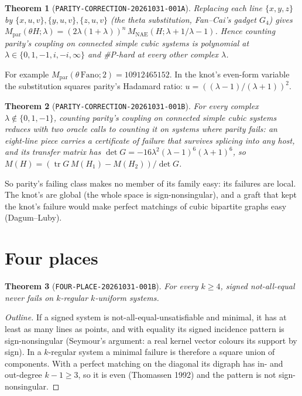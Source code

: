 \documentclass[11pt]{article}
\newtheorem{theorem}{Theorem}
\theoremstyle{definition}
\newcommand{\NAE}{\mathrm{NAE}}
\begin{document}
\begin{theorem}[\texttt{PARITY-CORRECTION-20261031-001A}]\label{thm:parity}
Replacing each line $\{x,y,z\}$ by $\{x,u,v\},\{y,u,v\},\{z,u,v\}$ (the theta substitution, Fan--Cai's gadget $G_4$) gives
$M_{\mathrm{par}}(\theta H;\lambda)=(2\lambda(1+\lambda))^n\,M_{\NAE}(H;\lambda+1/\lambda-1)$. Hence counting parity's coupling on
connected simple cubic systems is polynomial at $\lambda\in\{0,1,-1,i,-i,\infty\}$ and \#P-hard at every other complex $\lambda$.
\end{theorem}

For example $M_{\mathrm{par}}(\theta\,\mathrm{Fano};2)=10912465152$. In the knot's even-form variable the substitution squares parity's
Hadamard ratio: $u=((\lambda-1)/(\lambda+1))^2$.

\begin{theorem}[\texttt{PARITY-CORRECTION-20261031-001B}]\label{thm:parityfail}
For every complex $\lambda\notin\{0,1,-1\}$, counting parity's coupling on connected simple cubic systems reduces with two oracle calls to
counting it on systems where parity fails: an eight-line piece carries a certificate of failure that survives splicing into any host, and
its transfer matrix has $\det G=-16\lambda^2(\lambda-1)^6(\lambda+1)^6$, so $M(H)=(\operatorname{tr}G\,M(H_1)-M(H_2))/\det G$.
\end{theorem}

So parity's failing class makes no member of its family easy: its failures are local. The knot's are global (the whole space is
sign-nonsingular), and a graft that kept the knot's failure would make perfect matchings of cubic bipartite graphs easy (Dagum--Luby).

\section{Four places}\label{sec:four}

\begin{theorem}[\texttt{FOUR-PLACE-20261031-001B}]\label{thm:thomassen}
For every $k\ge4$, signed not-all-equal never fails on $k$-regular $k$-uniform systems.
\end{theorem}
\begin{proof}[Outline]
If a signed system is not-all-equal-unsatisfiable and minimal, it has at least as many lines as points, and with equality its signed
incidence pattern is sign-nonsingular (Seymour's argument: a real kernel vector colours its support by sign). In a $k$-regular system a
minimal failure is therefore a square union of components. With a perfect matching on the diagonal its digraph has in- and out-degree
$k-1\ge3$, so it is even (Thomassen 1992) and the pattern is not sign-nonsingular.
\end{proof}
\end{document}

